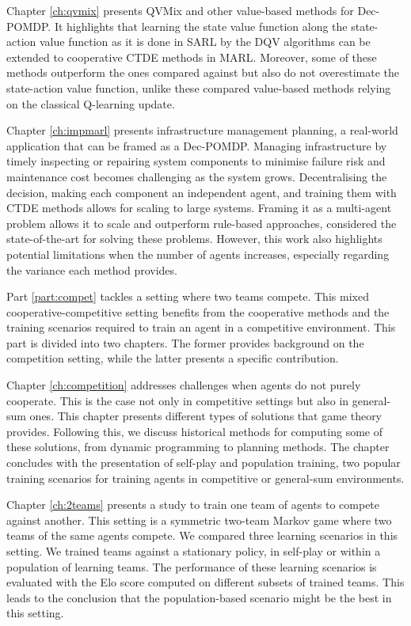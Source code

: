 Chapter \ref{ch:qvmix} presents QVMix and other value-based methods for Dec-POMDP.
It highlights that learning the state value function along the state-action value function as it is done in SARL by the DQV algorithms can be extended to cooperative CTDE methods in MARL.
Moreover, some of these methods outperform the ones compared against but also do not overestimate the state-action value function, unlike these compared value-based methods relying on the classical Q-learning update.

Chapter \ref{ch:impmarl} presents infrastructure management planning, a real-world application that can be framed as a Dec-POMDP.
Managing infrastructure by timely inspecting or repairing system components to minimise failure risk and maintenance cost becomes challenging as the system grows.
Decentralising the decision, making each component an independent agent, and training them with CTDE methods allows for scaling to large systems.
Framing it as a multi-agent problem allows it to scale and outperform rule-based approaches, considered the state-of-the-art for solving these problems.
However, this work also highlights potential limitations when the number of agents increases, especially regarding the variance each method provides.

Part \ref{part:compet} tackles a setting where two teams compete.
This mixed cooperative-competitive setting benefits from the cooperative methods and the training scenarios required to train an agent in a competitive environment.
This part is divided into two chapters.
The former provides background on the competition setting, while the latter presents a specific contribution.

Chapter \ref{ch:competition} addresses challenges when agents do not purely cooperate.
This is the case not only in competitive settings but also in general-sum ones.
This chapter presents different types of solutions that game theory provides.
Following this, we discuss historical methods for computing some of these solutions, from dynamic programming to planning methods.
The chapter concludes with the presentation of self-play and population training, two popular training scenarios for training agents in competitive or general-sum environments.

Chapter \ref{ch:2teams} presents a study to train one team of agents to compete against another.
This setting is a symmetric two-team Markov game where two teams of the same agents compete.
We compared three learning scenarios in this setting.
We trained teams against a stationary policy, in self-play or within a population of learning teams.
The performance of these learning scenarios is evaluated with the Elo score computed on different subsets of trained teams.
This leads to the conclusion that the population-based scenario might be the best in this setting.

